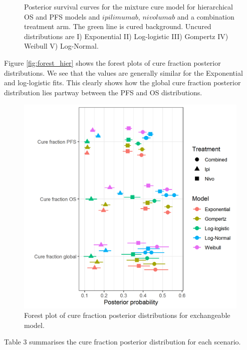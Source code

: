\documentclass[
]{article}
\begin{document}
\begin{figure}
{}

\caption{\label{fig:S_hier}Posterior survival curves for the mixture cure model for hierarchical OS and PFS models and $ipilimumab$, $nivolumab$ and a combination treatment arm. The green line is cured background. Uncured distributions are I) Exponential  II) Log-logistic III) Gompertz IV) Weibull V) Log-Normal.}\label{fig:unnamed-chunk-7}
\end{figure}

Figure \ref{fig:forest_hier} shows the forest plots of cure fraction
posterior distributions. We see that the values are generally similar
for the Exponential and log-logistic fits. This clearly shows how the
global cure fraction posterior distribution lies partway between the PFS
and OS distributions.

\begin{figure}

{\centering \includegraphics[width=0.6\linewidth]{../plots/cf hier_bg_fixed_forest_plot} 

}

\caption{\label{fig:forest_hier}Forest plot of cure fraction posterior distributions for exchangeable model.}\label{fig:unnamed-chunk-8}
\end{figure}

Table 3 summarises the cure fraction posterior distribution for each
scenario.
\end{document}
